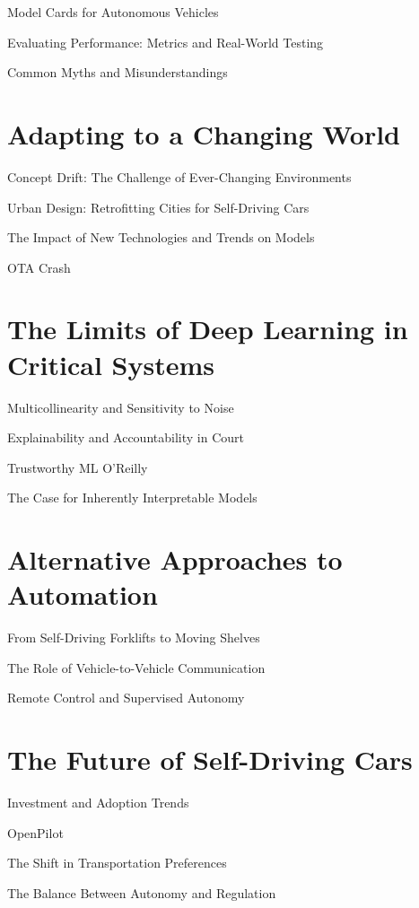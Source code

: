 Model Cards for Autonomous Vehicles

Evaluating Performance: Metrics and Real-World Testing

Common Myths and Misunderstandings

\section{Adapting to a Changing World}

Concept Drift: The Challenge of Ever-Changing Environments

Urban Design: Retrofitting Cities for Self-Driving Cars

The Impact of New Technologies and Trends on Models

OTA Crash \cite{otacrash}


\section{The Limits of Deep Learning in Critical Systems}

Multicollinearity and Sensitivity to Noise


Explainability and Accountability in Court

Trustworthy ML O'Reilly \cite{trustworthyml}

The Case for Inherently Interpretable Models


\section{Alternative Approaches to Automation}

From Self-Driving Forklifts to Moving Shelves

The Role of Vehicle-to-Vehicle Communication

Remote Control and Supervised Autonomy


\section{The Future of Self-Driving Cars}

Investment and Adoption Trends

OpenPilot \cite{openpilot}

The Shift in Transportation Preferences

The Balance Between Autonomy and Regulation
